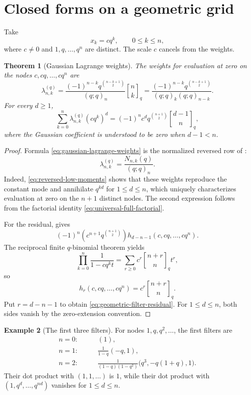 \documentclass[11pt,oneside,openany]{book}
\newtheorem{theorem}{Theorem}[chapter]
\theoremstyle{definition}
\newtheorem{example}[theorem]{Example}
\theoremstyle{remark}
\newcommand{\qbinom}[2]{\genfrac{[}{]}{0pt}{}{#1}{#2}_{q}}
\newcommand{\Qbinom}[3]{\genfrac{[}{]}{0pt}{}{#1}{#2}_{#3}}
\begin{document}
\section{Closed forms on a geometric grid}

Take
\[
 x_k=cq^k,
 \qquad 0\le k\le n,
\]
where $c\ne0$ and $1,q,\ldots,q^n$ are distinct.  The scale $c$ cancels from the weights.

\begin{theorem}[Gaussian Lagrange weights]\label{thm:gaussian-lagrange-weights}
The weights for evaluation at zero on the nodes $c,cq,\ldots,cq^n$ are
\begin{equation}
 \lambda_{n,k}^{(q)}
 =\frac{(-1)^{n-k}q^{\binom{n-k+1}{2}}}{(q;q)_n}
   \qbinom nk
 =\frac{(-1)^{n-k}q^{\binom{n-k+1}{2}}}
 {(q;q)_k(q;q)_{n-k}}.\label{eq:gaussian-lagrange-weights}
\end{equation}
For every $d\ge1$,
\begin{equation}
 \sum_{k=0}^n\lambda_{n,k}^{(q)}(cq^k)^d
 =(-1)^nc^dq^{\binom{n+1}{2}}
   \Qbinom{d-1}n q,\label{eq:geometric-filter-residual}
\end{equation}
where the Gaussian coefficient is understood to be zero when $d-1<n$.
\end{theorem}

\begin{proof}
Formula \eqref{eq:gaussian-lagrange-weights} is the normalized reversed row of :
\[
 \lambda_{n,k}^{(q)}=\frac{N_{n,k}(q)}{(q;q)_n}.
\]
Indeed, \eqref{eq:reversed-low-moments} shows that these weights reproduce the constant mode and annihilate $q^{kd}$ for $1\le d\le n$, which uniquely characterizes evaluation at zero on the $n+1$ distinct nodes.  The second expression follows from the factorial identity \eqref{eq:universal-full-factorial}.

For the residual,  gives
\[
 (-1)^n(c^{n+1}q^{\binom{n+1}{2}})
 h_{d-n-1}(c,cq,\ldots,cq^n).
\]
The reciprocal finite $q$-binomial theorem yields
\[
 \prod_{k=0}^n\frac1{1-cq^kt}
 =\sum_{r\ge0}c^r\Qbinom{n+r}nq t^r,
\]
so
\[
 h_r(c,cq,\ldots,cq^n)=c^r\Qbinom{n+r}nq.
\]
Put $r=d-n-1$ to obtain \eqref{eq:geometric-filter-residual}.  For $1\le d\le n$, both sides vanish by the zero-extension convention.
\end{proof}

\begin{example}[The first three filters]
For nodes $1,q,q^2,\ldots$, the first filters are
\begin{align*}
 n=0:&\qquad (1),\\
 n=1:&\qquad \frac1{1-q}(-q,1),\\
 n=2:&\qquad \frac1{(1-q)(1-q^2)}
 \bigl(q^3,-q(1+q),1\bigr).
\end{align*}
Their dot product with $(1,1,\ldots)$ is $1$, while their dot product with $(1,q^d,\ldots,q^{nd})$ vanishes for $1\le d\le n$.
\end{example}
\end{document}
